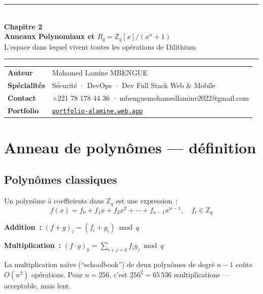 \documentclass[12pt, a4paper]{article}
\newcommand{\Zq}{\mathbb{Z}_q}
\begin{document}
\begin{center}
  {\color{suva_blue}\rule{\linewidth}{2pt}}\\[0.5cm]
  {\Huge\bfseries\color{suva_blue} Chapitre 2}\\[0.3cm]
  {\large\bfseries Anneaux Polynomiaux et $R_q = \mathbb{Z}_q[x]/(x^n+1)$}\\[0.2cm]
  {\small\color{gray} L'espace dans lequel vivent toutes les opérations de Dilithium}\\[0.3cm]
  {\color{suva_blue}\rule{\linewidth}{2pt}}
\end{center}

\begin{tcolorbox}[colback=suva_blue!5, colframe=suva_blue!40,
  left=6pt, right=6pt, top=4pt, bottom=4pt]
\small
\begin{tabular}{ll}
  \textbf{Auteur} & Mohamed Lamine MBENGUE \\
  \textbf{Spécialités} & Sécurité · DevOps · Dev Full Stack Web \& Mobile \\
  \textbf{Contact} & +221 78 178 44 36 · mbenguemohamedlamine2022@gmail.com \\
  \textbf{Portfolio} & \href{https://portfolio-alamine.web.app}{\texttt{portfolio-alamine.web.app}} \\
\end{tabular}
\end{tcolorbox}

\tableofcontents
\newpage

\section{Anneau de polynômes --- définition}

\subsection{Polynômes classiques}

Un polynôme à coefficients dans $\Zq$ est une expression~:
$$f(x) = f_0 + f_1 x + f_2 x^2 + \cdots + f_{n-1} x^{n-1}, \quad f_i \in \Zq$$

\textbf{Addition~:} $(f + g)_i = (f_i + g_i) \bmod q$

\textbf{Multiplication~:} $(f \cdot g)_k = \sum_{i+j=k} f_i g_j \bmod q$

La multiplication naïve (``schoolbook'') de deux polynômes de degré $n-1$
coûte $O(n^2)$ opérations. Pour $n = 256$, c'est $256^2 = 65\,536$
multiplications --- acceptable, mais lent.
\end{document}
